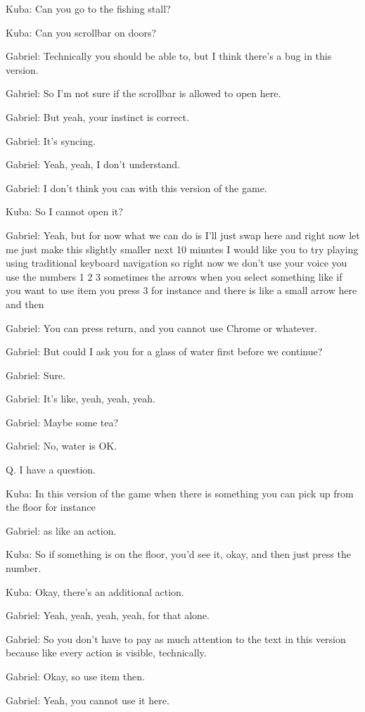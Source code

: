 Kuba: Can you go to the fishing stall?

Kuba: Can you scrollbar on doors?

Gabriel: Technically you should be able to, but I think there's a bug in this version.

Gabriel: So I'm not sure if the scrollbar is allowed to open here.

Gabriel: But yeah, your instinct is correct.

Gabriel: It's syncing.

Gabriel: Yeah, yeah, I don't understand.

Gabriel: I don't think you can with this version of the game.

Kuba: So I cannot open it?

Gabriel: Yeah, but for now what we can do is I'll just swap here and right now let me just make this slightly smaller next 10 minutes I would like you to try playing using traditional keyboard navigation so right now we don't use your voice you use the numbers 1 2 3 sometimes the arrows when you select something like if you want to use item you press 3 for instance and there is like a small arrow here and then

Gabriel: You can press return, and you cannot use Chrome or whatever.

Gabriel: But could I ask you for a glass of water first before we continue?

Gabriel: Sure.

Gabriel: It's like, yeah, yeah, yeah.

Gabriel: Maybe some tea?

Gabriel: No, water is OK.

Q. I have a question.

Kuba: In this version of the game when there is something you can pick up from the floor for instance

Gabriel: as like an action.

Kuba: So if something is on the floor, you'd see it, okay, and then just press the number.

Kuba: Okay, there's an additional action.

Gabriel: Yeah, yeah, yeah, yeah, for that alone.

Gabriel: So you don't have to pay as much attention to the text in this version because like every action is visible, technically.

Gabriel: Okay, so use item then.

Gabriel: Yeah, you cannot use it here.

